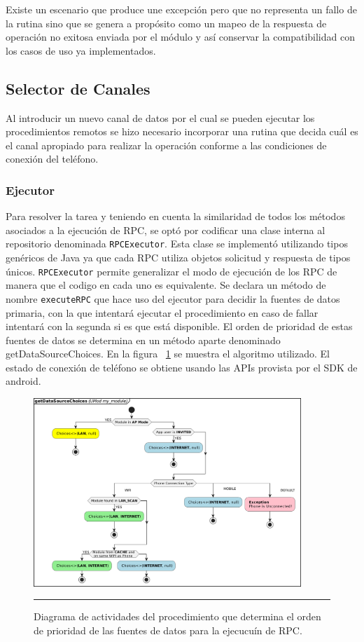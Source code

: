 Existe un escenario que produce une excepción pero que no representa un fallo de la rutina sino que se genera a propósito como un mapeo de la respuesta de operación no exitosa enviada por el módulo y así conservar la compatibilidad con los casos de uso ya implementados.


\subsection{Selector de Canales}
Al introducir un nuevo canal de datos por el cual se pueden ejecutar los procedimientos remotos se hizo necesario incorporar una rutina que decida cuál es el canal apropiado para realizar la operación conforme a las condiciones de conexión del teléfono.
\subsubsection{Ejecutor}
Para resolver la tarea y teniendo en cuenta la similaridad de todos los métodos asociados a la ejecución de RPC, se optó por codificar una clase interna al repositorio denominada \texttt{RPCExecutor}. Esta clase se implementó utilizando tipos genéricos de Java ya que cada RPC utiliza objetos solicitud y respuesta de tipos únicos. \texttt{RPCExecutor} permite generalizar el modo de ejecución de los RPC de manera que el codigo en cada uno es equivalente.
Se declara un método de nombre \texttt{executeRPC} que hace uso del ejecutor para decidir la fuentes de datos primaria, con la que intentará ejecutar el procedimiento en caso de fallar intentará con la segunda si es que está disponible.
El orden de prioridad de estas fuentes de datos se determina en un método aparte denominado getDataSourceChoices. En la figura ~\ref{fig:act_choices} se muestra el algoritmo utilizado. El estado de conexión de teléfono se obtiene usando las APIs provista por el SDK de android.

\begin{figure}[htbp]
	\centering
	\includegraphics[width=0.9\textwidth]{Figures/iter3/ACT_choice_ink.png}
	\rule{35em}{1pt}
	\caption[UML Diagram]{Diagrama de actividades del procedimiento que determina el orden de prioridad de las fuentes de datos para la ejecucuín de RPC.}
	\label{fig:act_choices}
\end{figure}



